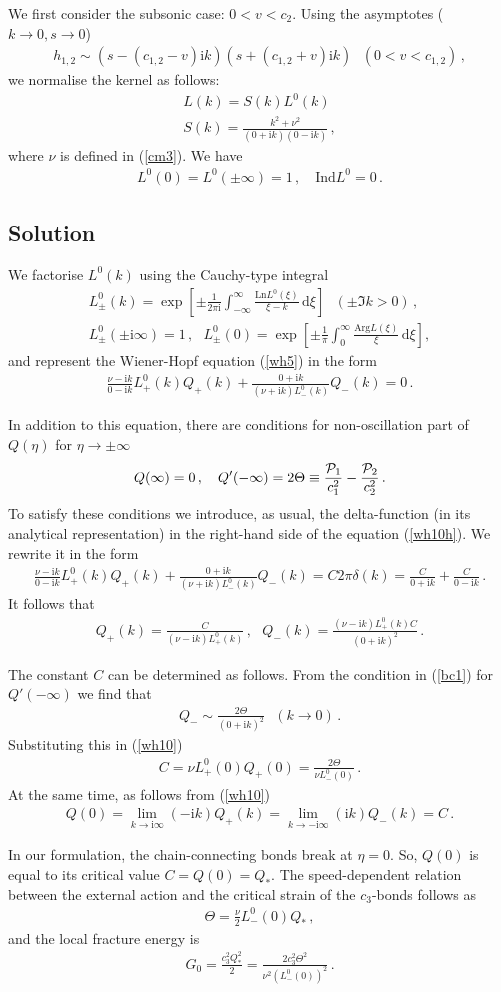 \documentclass[12pt]{article}
\newcommand{\f}{\frac}
\newcommand{\n}{\nonumber \\}
\newcommand{\beq}{\begin{eqnarray}}
\newcommand{\eeq}[1]{\label{#1}\end{eqnarray}}
\newcommand\eq[1]{(\ref{#1})}
\newcommand\gl{\left}
\newcommand\gr{\right}
\newcommand{\CP}{{\cal P}}
\newcommand{\Gd}{\delta}
\newcommand{\Gn}{\eta}
\newcommand{\GT}{\Theta}
\newcommand\D{\,\mathrm{d}}
\newcommand\I{\mathrm{i}}
\begin{document}
We first consider the subsonic case: $0<v<c_2$.
Using the asymptotes ($k\to 0, s\to 0$)
\beq h_{1,2}\sim (s-(c_{1,2}-v)\I k)(s+(c_{1,2}+v)\I k)~~~(0<v<c_{1,2})\,,\eeq{wh7}
we normalise the kernel as follows:
\beq L(k) = S(k)L^0(k)\,\n
S(k)=\f{k^2+\nu^2}{(0+\I k)(0-\I k)}\,,\eeq{wh8}
where $\nu$ is defined in \eq{cm3}. We have
\beq L^0(0)=L^0(\pm \infty)=1\,,~~~ \mbox{ Ind} L^0 =0\,.\eeq{wh8a}

\subsection{Solution}
We factorise $L^0(k)$ using the Cauchy-type integral
\beq L^0_\pm (k) = \exp\gl[\pm\f{1}{2\pi\I}\int_{-\infty}^\infty \f{\mbox{Ln} L^0(\xi)}{\xi -k}\D\xi\gr]~~~(\pm\Im k >0)\,,\n
L_\pm^0(\pm\I\infty)=1\,,~~~L^0_\pm(0) =\exp\gl[\pm\f{1}{\pi}\int_0^\infty \f{\mbox{Arg} L(\xi)}{\xi}\D\xi\gr], \eeq{wh9}
and represent the Wiener-Hopf equation \eq{wh5} in the form
\beq
\f{\nu-\I k}{0-\I k}L^0_+(k)Q_+(k) +\f{0+\I k}{(\nu+\I k)L^0_-(k)}Q_-(k) =0\,.\eeq{wh10h}

In addition to this equation, there are conditions for non-oscillation part of $Q(\Gn)$ for $\Gn\to\pm\infty$
\beq Q(\infty)=0\,,~~~Q'(-\infty) = 2\GT \equiv \f{\CP_1}{c_1^2} -   \f{\CP_2}{c_2^2}\,.\eeq{bc1}
To satisfy these conditions we introduce, as usual, the delta-function (in its analytical representation) in the right-hand side of the equation \eq{wh10h}. We rewrite it in the form
\beq \f{\nu-\I k}{0-\I k}L^0_+(k)Q_+(k) +\f{0+\I k}{(\nu+\I k)L^0_-(k)}Q_-(k) =C 2\pi \Gd(k) =\f{C}{0+\I k} + \f{C}{0-\I k}\,.\eeq{wh10}
It follows that
\beq Q_+(k) =\f{C}{(\nu-\I k)L^0_+(k)}\,,~~~Q_-(k) =\f{(\nu-\I k) L^0_+(k)C}{(0+\I k)^2}\,.\eeq{wh10aa}

The constant $C$ can be determined as follows. From the condition in \eq{bc1} for $Q'(-\infty)$ we find that
\beq Q_- \sim \f{2\GT}{(0+\I k)^2}~~~(k\to 0)\,.\eeq{wh110}
Substituting this in \eq{wh10}
\beq C =  \nu L^0_+(0)Q_+(0) = \f{2\GT}{\nu L^0_-(0)}\,.\eeq{wh111}
At the same time, as follows from \eq{wh10}
\beq Q(0) = \lim_{k\to \I\infty} (-\I k)Q_+(k)=\lim_{k\to -\I\infty} (\I k)Q_-(k) = C\,.\eeq{112}

In our formulation, the chain-connecting bonds break at $\Gn=0$. So, $Q(0)$ is equal to its critical value $C=Q(0)=Q_*$.  The speed-dependent relation between the external action and the critical strain of the $c_3$-bonds follows as
\beq \GT = \f{\nu}{2} L^0_-(0)Q_*\,,\eeq{113}
and the local fracture energy is
\beq G_0=\f{c_3^2 Q_*^2}{2}= \f{2c_3^2\GT^2}{\nu^2(L^0_-(0))^2}\,.\eeq{113a}
\end{document}
